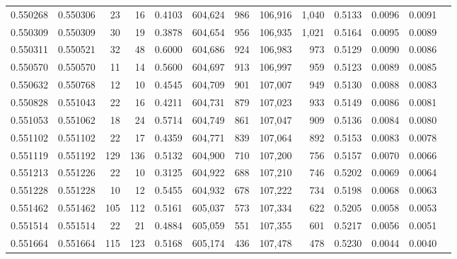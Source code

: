 \begin{tabular}{rrrrrrrrrrrrr}
0.550268 & 0.550306 &    23 &    16 &                                     0.4103 & 604,624 &     986 & 106,916 &   1,040 & 0.5133 & 0.0096 & 0.0091 \\
0.550309 & 0.550309 &    30 &    19 &                                     0.3878 & 604,654 &     956 & 106,935 &   1,021 & 0.5164 & 0.0095 & 0.0089 \\
0.550311 & 0.550521 &    32 &    48 &                                     0.6000 & 604,686 &     924 & 106,983 &     973 & 0.5129 & 0.0090 & 0.0086 \\
0.550570 & 0.550570 &    11 &    14 &                                     0.5600 & 604,697 &     913 & 106,997 &     959 & 0.5123 & 0.0089 & 0.0085 \\
0.550632 & 0.550768 &    12 &    10 &                                     0.4545 & 604,709 &     901 & 107,007 &     949 & 0.5130 & 0.0088 & 0.0083 \\
0.550828 & 0.551043 &    22 &    16 &                                     0.4211 & 604,731 &     879 & 107,023 &     933 & 0.5149 & 0.0086 & 0.0081 \\
0.551053 & 0.551062 &    18 &    24 &                                     0.5714 & 604,749 &     861 & 107,047 &     909 & 0.5136 & 0.0084 & 0.0080 \\
0.551102 & 0.551102 &    22 &    17 &                                     0.4359 & 604,771 &     839 & 107,064 &     892 & 0.5153 & 0.0083 & 0.0078 \\
0.551119 & 0.551192 &   129 &   136 &                                     0.5132 & 604,900 &     710 & 107,200 &     756 & 0.5157 & 0.0070 & 0.0066 \\
0.551213 & 0.551226 &    22 &    10 &                                     0.3125 & 604,922 &     688 & 107,210 &     746 & 0.5202 & 0.0069 & 0.0064 \\
0.551228 & 0.551228 &    10 &    12 &                                     0.5455 & 604,932 &     678 & 107,222 &     734 & 0.5198 & 0.0068 & 0.0063 \\
0.551462 & 0.551462 &   105 &   112 &                                     0.5161 & 605,037 &     573 & 107,334 &     622 & 0.5205 & 0.0058 & 0.0053 \\
0.551514 & 0.551514 &    22 &    21 &                                     0.4884 & 605,059 &     551 & 107,355 &     601 & 0.5217 & 0.0056 & 0.0051 \\
0.551664 & 0.551664 &   115 &   123 &                                     0.5168 & 605,174 &     436 & 107,478 &     478 & 0.5230 & 0.0044 & 0.0040 \\

\end{tabular}
